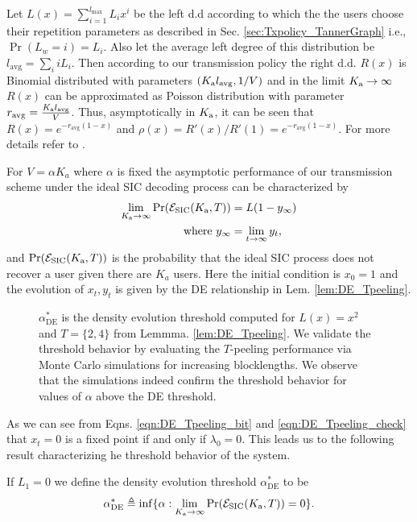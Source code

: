 Let $L(x)=\sum_{i=1}^{l_{\max}} L_i x^i$ be the left d.d according to which the the users choose their repetition parameters as described in Sec. \ref{sec:Txpolicy_TannerGraph} i.e., $\Pr(L_{w}=i)=L_i$. Also let the average left degree of this distribution be $l_{\text{avg}}=\sum_i iL_i$. Then according to our transmission policy the right d.d. $R(x)$ is Binomial distributed with parameters $(K_{\text{a}} l_{\text{avg}},1/V)$  and in the limit $K_{\text{a}}\rightarrow \infty$ $R(x)$ can be approximated as Poisson distribution with parameter $r_{\text{avg}}=\frac{K_{\text{a}} l_{\text{avg}}}{V}$. Thus, asymptotically in $K_{\text{a}}$, it can be seen that $R(x)=e^{-r_{\text{avg}}(1-x)}$ and $\rho(x)=R'(x)/R'(1)=e^{-r_{\text{avg}}(1-x)}$. For more details refer to \cite{narayanan2012iterative}.

\begin{lemma} For $V=\alpha K_a$ where $\alpha$ is fixed the asymptotic performance of our transmission scheme under the ideal SIC decoding process can be characterized by %
\begin{align*}
\lim_{K_{\text{a}}\rightarrow \infty} \mathrm{Pr}(\mathcal{E}_{\text{SIC}}(K_{\text{a}},T))&=L(1-y_{\infty})\notag\\
\text{ where } y_{\infty} &=\lim_{t\rightarrow\infty} y_t,
\end{align*}
and $\mathrm{Pr}(\mathcal{E}_{\text{SIC}}(K_{\text{a}},T))$ is the probability that the ideal SIC process does not recover a user given there  are $K_a$ users. Here the initial condition is $x_0=1$ and the evolution of $x_t,y_t$ is given by the DE relationship in Lem. \ref{lem:DE_Tpeeling}.
\label{lem:asymptotic_SIC}
\end{lemma}

\begin{figure}[h!]
  \centering
  \resizebox{0.6\textwidth}{!}{}
  \caption{$\alpha^*_{\text{DE}}$ is the density evolution threshold computed for $L(x)=x^2$ and $T=\{2,4\}$ from Lemmma. \eqref{lem:DE_Tpeeling}. We validate the threshold behavior by evaluating the $T$-peeling performance via Monte Carlo simulations for increasing blocklengths. We observe that the simulations indeed confirm the threshold behavior for values of $\alpha$ above the DE threshold.}
  \label{fig:DEvBP}
\end{figure}

As we can see from Eqns. \eqref{eqn:DE_Tpeeling_bit} and \eqref{eqn:DE_Tpeeling_check} that $x_t=0$ is a fixed point if and only if $\lambda_0=0$. This leads us to the following result characterizing he threshold behavior of the system.
\begin{definition}
If $L_1=0$ we define the density evolution threshold $\alpha^*_{\text{DE}}$ to be
\[
\alpha^*_{\text{DE}}\triangleq \inf \{\alpha: \lim_{K_{\text{a}}\rightarrow \infty} \mathrm{Pr}(\mathcal{E}_{\text{SIC}}(K_{\text{a}},T))=0\}.
\]
\label{def:DE_threshold}
\end{definition}


